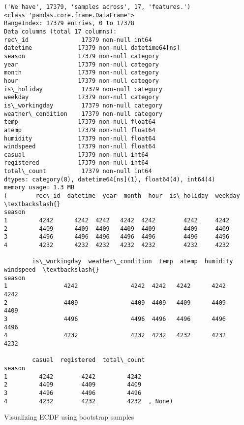 \documentclass[11pt]{article}
\begin{document}
    \begin{Verbatim}[commandchars=\\\{\}]
('We have', 17379, 'samples across', 17, 'features.')
<class 'pandas.core.frame.DataFrame'>
RangeIndex: 17379 entries, 0 to 17378
Data columns (total 17 columns):
rec\_id               17379 non-null int64
datetime             17379 non-null datetime64[ns]
season               17379 non-null category
year                 17379 non-null category
month                17379 non-null category
hour                 17379 non-null category
is\_holiday           17379 non-null category
weekday              17379 non-null category
is\_workingday        17379 non-null category
weather\_condition    17379 non-null category
temp                 17379 non-null float64
atemp                17379 non-null float64
humidity             17379 non-null float64
windspeed            17379 non-null float64
casual               17379 non-null int64
registered           17379 non-null int64
total\_count          17379 non-null int64
dtypes: category(8), datetime64[ns](1), float64(4), int64(4)
memory usage: 1.3 MB
(        rec\_id  datetime  year  month  hour  is\_holiday  weekday  \textbackslash{}
season                                                             
1         4242      4242  4242   4242  4242        4242     4242   
2         4409      4409  4409   4409  4409        4409     4409   
3         4496      4496  4496   4496  4496        4496     4496   
4         4232      4232  4232   4232  4232        4232     4232   

        is\_workingday  weather\_condition  temp  atemp  humidity  windspeed  \textbackslash{}
season                                                                       
1                4242               4242  4242   4242      4242       4242   
2                4409               4409  4409   4409      4409       4409   
3                4496               4496  4496   4496      4496       4496   
4                4232               4232  4232   4232      4232       4232   

        casual  registered  total\_count  
season                                   
1         4242        4242         4242  
2         4409        4409         4409  
3         4496        4496         4496  
4         4232        4232         4232  , None)

    \end{Verbatim}

    Visualizing ECDF using bootstrap samples
\end{document}
